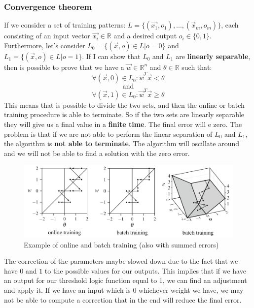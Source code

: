\documentclass{article}
\begin{document}
\subsubsection{Convergence theorem}
If we consider a set of training patterns: $L=\{(\vec{x_1},o_1),...,(\vec{x}_m,o_m)\}$,
each consisting of an input vector $\vec{x_i}\in\mathbb{R}$ and a desired
output $o_i\in\{0,1\}$.
\newline\newline
Furthermore, let's consider $L_0=\{(\vec{x},o)\in L|o=0\}$ and
$L_1=\{(\vec{x},o)\in L | o=1\}$. If I can show that $L_0$ and $L_1$ are
\textbf{linearly separable}, then is possible to prove that we have a
$\vec{w}\in\mathbb{R}^n$ and $\theta\in\mathbb{R}$ such that:
$$\forall (\vec{x},0)\in L_0 :\vec{w}^T\vec{x} <\theta$$
$$\text{and}$$
$$\forall (\vec{x},1)\in L_0:\vec{w}^T\vec{x}\geq\theta$$
This means that is possible to divide the two sets, and then the online or batch
training procedure is able to terminate. So if the two sets are linearly separable they
will give us a final value in a \textbf{finite time}. The final error will e zero.
\newline\newline
The problem is that if we are not able to perform the linear separation of $L_0$ and $L_1$,
the algorithm is \textbf{not able to terminate}. The algorithm will oscillate around and we
will not be able to find a solution with the zero error.
\begin{figure}[H]
    \centering
    \includegraphics[scale=0.4]{images/batch_training_example_graph.png}
    \caption{Example of online and batch training (also with summed errors)}
\end{figure}
The correction of the parameters maybe slowed down due to the fact that we have $0$ and $1$
to the possible values for our outputs. This implies that if we have an output for our
threshold logic function equal to $1$, we can find an adjustment and apply it.
If we have an input which is $0$ whichever weight we have, we may not be able to compute
a correction that in the end will reduce the final error.
\end{document}

